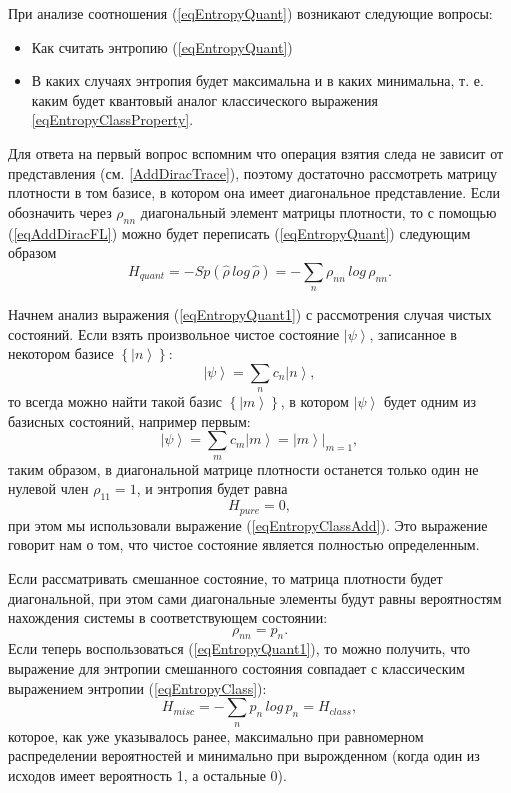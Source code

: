 При анализе соотношения (\ref{eqEntropyQuant}) возникают следующие
вопросы:
\begin{itemize}
\item Как считать энтропию (\ref{eqEntropyQuant})
\item В каких случаях энтропия будет максимальна и в каких минимальна,
  т. е. каким будет квантовый аналог классического выражения
  \ref{eqEntropyClassProperty}. 
\end{itemize}

Для ответа на первый вопрос вспомним что операция взятия следа не
зависит от представления (см. \ref{AddDiracTrace}), поэтому
достаточно рассмотреть матрицу плотности в том базисе, в котором она имеет
диагональное представление. Если обозначить через $\rho_{nn}$
диагональный элемент матрицы плотности, то с помощью (\ref{eqAddDiracFL})
можно будет переписать (\ref{eqEntropyQuant}) следующим образом
\begin{equation}
H_{quant} = - Sp \left(\hat{\rho} \, log \, \hat{\rho}\right) = 
- \sum_n \rho_{nn} \, log \, \rho_{nn}.
\label{eqEntropyQuant1}
\end{equation}

Начнем анализ выражения (\ref{eqEntropyQuant1}) с рассмотрения случая чистых состояний.
Если взять произвольное чистое состояние $\left|\psi\right>$,
записанное в некотором базисе $\left\{\left|n\right>\right\}$:
\[
\left|\psi\right> = \sum_n c_n \left|n\right>,
\]
то всегда можно найти такой базис $\left\{\left|m\right>\right\}$, в
котором $\left|\psi\right>$ будет одним из базисных состояний, например первым: 
\[
\left|\psi\right> = \sum_m c_m \left|m\right> = 
\left.\left|m\right>\right|_{m = 1},
\]
таким образом, в диагональной матрице плотности останется только один
не нулевой член $\rho_{11} = 1$, и энтропия будет равна
\begin{equation}
H_{pure} = 0,
\label{eqQIEntropyPure}
\end{equation}
при этом мы использовали выражение (\ref{eqEntropyClassAdd}). Это
выражение говорит нам о том, что чистое состояние является полностью
определенным. 

Если рассматривать смешанное состояние, то матрица плотности будет
диагональной, при этом сами диагональные элементы будут равны
вероятностям нахождения системы в соответствующем состоянии:
\[
\rho_{nn} = p_n.
\]
Если теперь воспользоваться (\ref{eqEntropyQuant1}), то можно получить,
что выражение для энтропии смешанного состояния совпадает с
классическим выражением энтропии (\ref{eqEntropyClass}):
\begin{equation}
H_{misc} = - \sum_n p_n \, log \, p_n = H_{class},
\label{eqQIEntropyMisc}
\end{equation}
которое, как уже указывалось ранее, максимально при равномерном распределении
вероятностей и минимально при вырожденном (когда один из исходов имеет
вероятность 1, а остальные 0).

